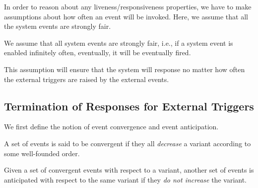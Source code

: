 In order to reason about any liveness/responsiveness properties, we
have to make assumptions about how often an event will be invoked.
Here, we assume that all the system events are strongly fair.
\begin{assumption}
  \label{asm:SF}
  We assume that all system events are strongly fair, i.e., if a system
  event is enabled infinitely often, eventually, it will be eventually
  fired.
\end{assumption}
This assumption will ensure that the system will response no matter
how often the external triggers are raised by the external events.

\subsection{Termination of Responses for External Triggers}
\label{sec:contr-rema-resp}

We first define the notion of event convergence and event
anticipation.
\begin{definition}
  \label{def:conv}
  A set of events is said to be convergent if they all \emph{decrease}
  a variant according to some well-founded order.
\end{definition}

\begin{definition}
  \label{def:anticipated}
  Given a set of convergent events with respect to a variant,
  another set of events is anticipated with respect to the
  same variant if they \emph{do not increase} the variant.
\end{definition}

